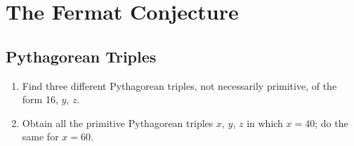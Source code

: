 \chapter{The Fermat Conjecture}

\section{Pythagorean Triples}

\begin{exercise}
    \begin{enumerate}
        \item Find three different Pythagorean triples, not necessarily primitive, of the form 16, $y$, $z$.
        \item Obtain all the primitive Pythagorean triples $x$, $y$, $z$ in which $x = 40$; do the same for $x= 60$.\\
    \end{enumerate}
\end{exercise}


